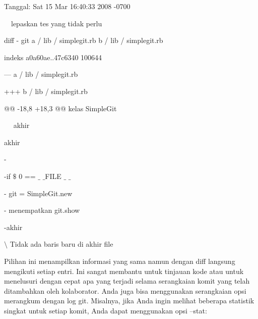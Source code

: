 \noindent 
 \hspace*{0.5in} Tanggal: Sat 15 Mar 16:40:33 2008 -0700 \par
\noindent 
 \hspace*{0.5in}  $  $ $  $ $  $ $  $lepaskan tes yang tidak perlu \par
\noindent 
 \hspace*{0.5in}  \hspace*{0.5in} diff - git a / lib / simplegit.rb b / lib / simplegit.rb \par
\noindent 
 \hspace*{0.5in}  \hspace*{0.5in} indeks a0a60ae..47c6340 100644 \par
\noindent 
 \hspace*{0.5in}  \hspace*{0.5in} --- a / lib / simplegit.rb \par
\noindent 
 \hspace*{0.5in}  \hspace*{0.5in} +++ b / lib / simplegit.rb \par
\noindent 
 \hspace*{0.5in}  \hspace*{0.5in} @@ -18,8 +18,3 @@ kelas SimpleGit \par
\noindent 
 \hspace*{0.5in}  \hspace*{0.5in}  $  $ $  $ $  $ $  $ $  $akhir \par
\noindent 
 \hspace*{0.5in}  $  $akhir \par
\noindent 
 \hspace*{0.5in} - \par
\noindent 
 \hspace*{0.5in} -if  $  \$  $ 0 ==  $  \_  $ $  \_  $FILE $  \_  $ $  \_  $ \par
\noindent 
 \hspace*{0.5in} - git = SimpleGit.new \par
\noindent 
 \hspace*{0.5in} - menempatkan git.show \par
\noindent 
 \hspace*{0.5in} -akhir \par
\noindent 
 \hspace*{0.5in}  $  \setminus  $ Tidak ada baris baru di akhir file \par
\noindent 
 \hspace*{0.5in} Pilihan ini menampilkan informasi yang sama namun dengan diff langsung mengikuti setiap entri. Ini sangat membantu untuk tinjauan kode atau untuk menelusuri dengan cepat apa yang terjadi selama serangkaian komit yang telah ditambahkan oleh kolaborator. Anda juga bisa menggunakan serangkaian opsi merangkum dengan log git. Misalnya, jika Anda ingin melihat beberapa statistik singkat untuk setiap komit, Anda dapat menggunakan opsi --stat: \par
